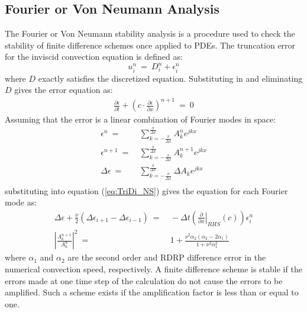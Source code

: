 \documentclass[conf]{new-aiaa}
\begin{document}
\subsection{Fourier or Von Neumann Analysis}
The Fourier or Von Neumann stability analysis is a procedure used to check the stability of finite difference schemes once applied to PDEs. The truncation error for the inviscid convection equation is defined as:
\begin{equation*}
	u_i^n~=~D_i^n+\epsilon_i^n
\end{equation*}
where $D$ exactly satisfies the discretized equation. Substituting in and eliminating $D$ gives the error equation as:
\begin{equation}
	\begin{split}
		\label{eq:Implicit_Scheme_Error}
  			\frac{\partial{\epsilon}}{\partial{t}} +\left(c\cdot\frac{\partial{\epsilon}}{\partial{x}}\right)^{n+1}~=~0
	\end{split}
\end{equation}
Assuming that the error is a linear combination of Fourier modes in space: 
\begin{equation}
	\begin{split}
		\label{eq:Error_Fourier}
  			\epsilon^n~=&~\sum_{k=-\frac{\pi}{\Delta{x}}}^{\frac{\pi}{\Delta{x}}}{A_k^n e^{jkx}} \\
  			\epsilon^{n+1}~=&~\sum_{k=-\frac{\pi}{\Delta{x}}}^{\frac{\pi}{\Delta{x}}}{A_k^{n+1} e^{jkx}} \\
  			\Delta{\epsilon}~=&~\sum_{k=-\frac{\pi}{\Delta{x}}}^{\frac{\pi}{\Delta{x}}}{\Delta{A_k} e^{jkx}} \\
	\end{split}
\end{equation}
substituting into equation (\ref{eq:TriDi_NS}) gives the equation for each Fourier mode as:
\begin{equation}
	\begin{split}
		\label{eq:Fourier_Mode_LHS_neq_RHS}
   			\Delta{\epsilon}+\frac{\nu}{2}\left(\Delta{\epsilon_{i+1}}-\Delta{\epsilon_{i-1}} \right)~=&~-\Delta{t}\left(\left.\frac{\partial}{\partial{x}}\right|_{RHS}\left( c \right)\right) {\epsilon}_i^{n} \\
  			\left|\frac{A_k^{n+1}}{A_k^{n}} \right|^2~=&~1+\frac{\nu^2\alpha_2\left(\alpha_2-2\alpha_1\right)}{1+\nu^2\alpha_1^2}
	\end{split}
\end{equation}
where $\alpha_1$ and $\alpha_2$ are the second order and RDRP difference error in the numerical convection speed, respectively. 
A finite difference scheme is stable if the errors made at one time step of the calculation do not cause the errors to be amplified. 
Such a scheme exists if the amplification factor is less than or equal to one. 
\end{document}
